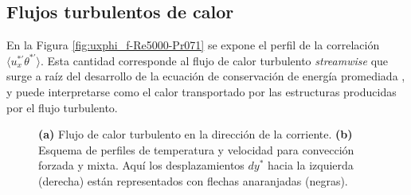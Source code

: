 \subsection{Flujos turbulentos de calor} 

En la Figura \ref{fig:uxphi_f-Re5000-Pr071} se expone el perfil de la correlación $\langle u_x^{\ast \prime } \theta^{\ast \prime } \rangle$. Esta cantidad corresponde al flujo de calor turbulento \textit{streamwise} que surge a raíz del desarrollo de la ecuación de conservación de energía promediada \cite{kundu,pope2001turbulent}, y puede interpretarse como el calor transportado por las estructuras producidas por el flujo turbulento.  

\begin{figure}[H]
  \centering
    \caption{\textbf{(a)} Flujo de calor turbulento en la dirección de la corriente. \textbf{(b)} Esquema de perfiles de temperatura y velocidad para convección forzada y mixta. Aquí los desplazamientos $dy^*$ hacia la izquierda (derecha) están representados con flechas anaranjadas (negras).}
    \label{fig:rms-Re5000-Pr071}
\end{figure}

